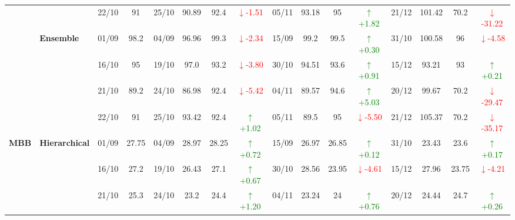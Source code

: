 {\begin{longtable}{llcc|cccc|cccc|cccc}
&
& 22/10 & 91 & 25/10 & 90.89 & 92.4 & \textcolor{red}{\(\downarrow\)-1.51} & 05/11 & 93.18 & 95 & \textcolor{green}{\(\uparrow\)+1.82} & 21/12 & 101.42 & 70.2 & \textcolor{red}{\(\downarrow\)-31.22} \\
\cmidrule(lr){2-16}


& \textbf{Ensemble}
& 01/09 & 98.2 & 04/09 & 96.96 & 99.3 & \textcolor{red}{\(\downarrow\)-2.34} & 15/09 & 99.2 & 99.5 & \textcolor{green}{\(\uparrow\)+0.30} & 31/10 & 100.58 & 96 & \textcolor{red}{\(\downarrow\)-4.58} \\

&
& 16/10 & 95 & 19/10 & 97.0 & 93.2 & \textcolor{red}{\(\downarrow\)-3.80} & 30/10 & 94.51 & 93.6 & \textcolor{green}{\(\uparrow\)+0.91} & 15/12 & 93.21 & 93 & \textcolor{green}{\(\uparrow\)+0.21} \\

&
& 21/10 & 89.2 & 24/10 & 86.98 & 92.4 & \textcolor{red}{\(\downarrow\)-5.42} & 04/11 & 89.57 & 94.6 & \textcolor{green}{\(\uparrow\)+5.03} & 20/12 & 99.67 & 70.2 & \textcolor{red}{\(\downarrow\)-29.47} \\

&
& 22/10 & 91 & 25/10 & 93.42 & 92.4 & \textcolor{green}{\(\uparrow\)+1.02} & 05/11 & 89.5 & 95 & \textcolor{red}{\(\downarrow\)-5.50} & 21/12 & 105.37 & 70.2 & \textcolor{red}{\(\downarrow\)-35.17} \\
\midrule



\multirow{12}{*}{\textbf{MBB}} 
& \textbf{Hierarchical}
& 01/09 & 27.75 & 04/09 & 28.97 & 28.25 & \textcolor{green}{\(\uparrow\)+0.72} & 15/09 & 26.97 & 26.85 & \textcolor{green}{\(\uparrow\)+0.12} & 31/10 & 23.43 & 23.6 & \textcolor{green}{\(\uparrow\)+0.17} \\

&
& 16/10 & 27.2 & 19/10 & 26.43 & 27.1 & \textcolor{green}{\(\uparrow\)+0.67} & 30/10 & 28.56 & 23.95 & \textcolor{red}{\(\downarrow\)-4.61} & 15/12 & 27.96 & 23.75 & \textcolor{red}{\(\downarrow\)-4.21} \\

&
& 21/10 & 25.3 & 24/10 & 23.2 & 24.4 & \textcolor{green}{\(\uparrow\)+1.20} & 04/11 & 23.24 & 24 & \textcolor{green}{\(\uparrow\)+0.76} & 20/12 & 24.44 & 24.7 & \textcolor{green}{\(\uparrow\)+0.26} \\


\end{longtable}}
